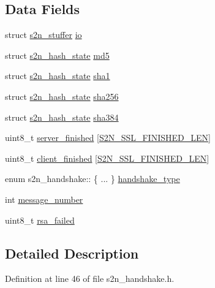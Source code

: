 \subsection*{Data Fields}
\begin{DoxyCompactItemize}
\item 
struct \hyperlink{structs2n__stuffer}{s2n\+\_\+stuffer} \hyperlink{structs2n__handshake_aede0d4a81b6e474b17ea185025c45bfd}{io}
\item 
struct \hyperlink{structs2n__hash__state}{s2n\+\_\+hash\+\_\+state} \hyperlink{structs2n__handshake_aef86a1eeef902f13a68011b824cfe662}{md5}
\item 
struct \hyperlink{structs2n__hash__state}{s2n\+\_\+hash\+\_\+state} \hyperlink{structs2n__handshake_a6cc3a653d5553d51a2c56300e3679a37}{sha1}
\item 
struct \hyperlink{structs2n__hash__state}{s2n\+\_\+hash\+\_\+state} \hyperlink{structs2n__handshake_a6fbd9191b9b38b2d5501be965b0b6d6c}{sha256}
\item 
struct \hyperlink{structs2n__hash__state}{s2n\+\_\+hash\+\_\+state} \hyperlink{structs2n__handshake_a93c2f9ab8a54dcaa33e3b8c9524d6069}{sha384}
\item 
uint8\+\_\+t \hyperlink{structs2n__handshake_a93637661124329bd2a8b9110e00c6766}{server\+\_\+finished} \mbox{[}\hyperlink{tls_2s2n__crypto_8h_a687b2e6f366133714257fc7e9d6537bd}{S2\+N\+\_\+\+S\+S\+L\+\_\+\+F\+I\+N\+I\+S\+H\+E\+D\+\_\+\+L\+EN}\mbox{]}
\item 
uint8\+\_\+t \hyperlink{structs2n__handshake_a2855df54edee8fcbca0272bfa74784ca}{client\+\_\+finished} \mbox{[}\hyperlink{tls_2s2n__crypto_8h_a687b2e6f366133714257fc7e9d6537bd}{S2\+N\+\_\+\+S\+S\+L\+\_\+\+F\+I\+N\+I\+S\+H\+E\+D\+\_\+\+L\+EN}\mbox{]}
\item 
enum s2n\+\_\+handshake\+:: \{ ... \}  \hyperlink{structs2n__handshake_a8b8974068a8f2c38a061ffb495a5ca1c}{handshake\+\_\+type}
\item 
int \hyperlink{structs2n__handshake_a37342dbc9310ac8f4dbb4bdaef29de26}{message\+\_\+number}
\item 
uint8\+\_\+t \hyperlink{structs2n__handshake_a65e2d8c6247963b90c9c2e3d574b0319}{rsa\+\_\+failed}
\end{DoxyCompactItemize}


\subsection{Detailed Description}


Definition at line 46 of file s2n\+\_\+handshake.\+h.



